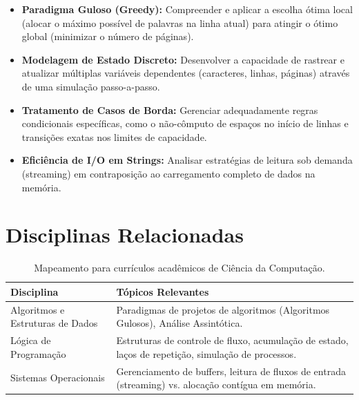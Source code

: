 \documentclass[11pt]{article}
\begin{document}

\begin{objetivobox}
\begin{itemize}
    \item \textbf{Paradigma Guloso (Greedy):} Compreender e aplicar a escolha ótima local (alocar o máximo possível de palavras na linha atual) para atingir o ótimo global (minimizar o número de páginas).
    \item \textbf{Modelagem de Estado Discreto:} Desenvolver a capacidade de rastrear e atualizar múltiplas variáveis dependentes (caracteres, linhas, páginas) através de uma simulação passo-a-passo.
    \item \textbf{Tratamento de Casos de Borda:} Gerenciar adequadamente regras condicionais específicas, como o não-cômputo de espaços no início de linhas e transições exatas nos limites de capacidade.
    \item \textbf{Eficiência de I/O em Strings:} Analisar estratégias de leitura sob demanda (streaming) em contraposição ao carregamento completo de dados na memória.
\end{itemize}
\end{objetivobox}

\vspace{0.5em}

\section{Disciplinas Relacionadas}
\begin{table}[h]
\centering
\begin{tabularx}{\textwidth}{l X}
\toprule
\textbf{Disciplina} & \textbf{Tópicos Relevantes} \\
\midrule
Algoritmos e Estruturas de Dados & Paradigmas de projetos de algoritmos (Algoritmos Gulosos), Análise Assintótica. \\
Lógica de Programação & Estruturas de controle de fluxo, acumulação de estado, laços de repetição, simulação de processos. \\
Sistemas Operacionais & Gerenciamento de buffers, leitura de fluxos de entrada (streaming) vs. alocação contígua em memória. \\
\bottomrule
\end{tabularx}
\caption{Mapeamento para currículos acadêmicos de Ciência da Computação.}
\end{table}
\end{document}
